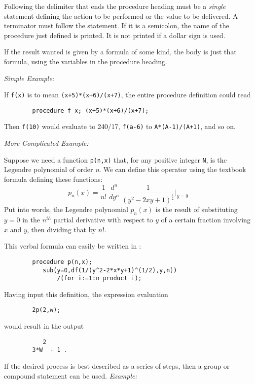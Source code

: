 Following the delimiter that ends the procedure heading must be a {\em
single} statement defining the action to be performed or the value to be
delivered.  A terminator must follow the statement.  If it is a semicolon,
the name of the procedure just defined is printed.  It is not printed if a
dollar sign is used.

If the result wanted is given by a formula of some kind, the body is just
that formula, using the variables in the procedure heading.

{\it Simple Example:}

If {\tt f(x)} is to mean {\tt (x+5)*(x+6)/(x+7)}, the entire procedure
definition could read
\begin{verbatim}
        procedure f x; (x+5)*(x+6)/(x+7);
\end{verbatim}
Then {\tt f(10)} would evaluate to 240/17, {\tt f(a-6)} to
{\tt A*(A-1)/(A+1)}, and so on.

{\it More Complicated Example:}

Suppose we need a function {\tt p(n,x)} that, for any positive integer
{\tt N}, is the Legendre polynomial of order
{\em n}. We can define this operator using the
textbook formula defining these functions:
\begin{displaymath}
p_n(x) = \frac{1}{n!}\  
\frac{{d}^n}{dy^n}\ \frac{1}{{(y^2 - 2xy + 1)}^{\frac{1}{2}}}\Bigr\vert_{y=0}
\end{displaymath}
Put into words, the Legendre polynomial $p_n(x)$ is the result of
substituting $y=0$ in the $n^{th}$ partial derivative with respect to $y$
of a certain fraction involving $x$ and $y$, then dividing that by $n!$.

This verbal formula can easily be written in {\REDUCE}:
\begin{verbatim}
        procedure p(n,x);
           sub(y=0,df(1/(y^2-2*x*y+1)^(1/2),y,n))
               /(for i:=1:n product i);
\end{verbatim}
Having input this definition, the expression evaluation
\begin{verbatim}
        2p(2,w);
\end{verbatim}
would result in the output
\begin{verbatim}
           2
        3*W  - 1 .
\end{verbatim}
If the desired process is best described as a series of steps, then a group
or compound statement can be used.
\extendedmanual{\newpage}
{\it Example:}

